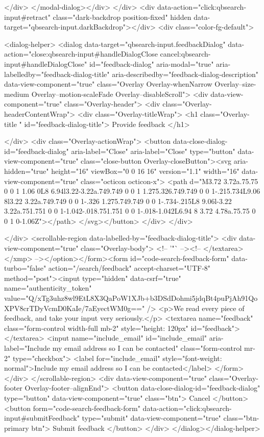     </div>
</modal-dialog></div>
  </div>
  <div data-action="click:qbsearch-input#retract" class="dark-backdrop position-fixed" hidden data-target="qbsearch-input.darkBackdrop"></div>
  <div class="color-fg-default">
    
<dialog-helper>
  <dialog data-target="qbsearch-input.feedbackDialog" data-action="close:qbsearch-input#handleDialogClose cancel:qbsearch-input#handleDialogClose" id="feedback-dialog" aria-modal="true" aria-labelledby="feedback-dialog-title" aria-describedby="feedback-dialog-description" data-view-component="true" class="Overlay Overlay-whenNarrow Overlay--size-medium Overlay--motion-scaleFade Overlay--disableScroll">
    <div data-view-component="true" class="Overlay-header">
  <div class="Overlay-headerContentWrap">
    <div class="Overlay-titleWrap">
      <h1 class="Overlay-title " id="feedback-dialog-title">
        Provide feedback
      </h1>
        
    </div>
    <div class="Overlay-actionWrap">
      <button data-close-dialog-id="feedback-dialog" aria-label="Close" aria-label="Close" type="button" data-view-component="true" class="close-button Overlay-closeButton"><svg aria-hidden="true" height="16" viewBox="0 0 16 16" version="1.1" width="16" data-view-component="true" class="octicon octicon-x">
    <path d="M3.72 3.72a.75.75 0 0 1 1.06 0L8 6.94l3.22-3.22a.749.749 0 0 1 1.275.326.749.749 0 0 1-.215.734L9.06 8l3.22 3.22a.749.749 0 0 1-.326 1.275.749.749 0 0 1-.734-.215L8 9.06l-3.22 3.22a.751.751 0 0 1-1.042-.018.751.751 0 0 1-.018-1.042L6.94 8 3.72 4.78a.75.75 0 0 1 0-1.06Z"></path>
</svg></button>
    </div>
  </div>
  
</div>
      <scrollable-region data-labelled-by="feedback-dialog-title">
        <div data-view-component="true" class="Overlay-body">        <!-- '"` --><!-- </textarea></xmp> --></option></form><form id="code-search-feedback-form" data-turbo="false" action="/search/feedback" accept-charset="UTF-8" method="post"><input type="hidden" data-csrf="true" name="authenticity_token" value="Q/xTg3uhz8wl9EtL8X3QaPoW1XJb+b3DSdDohmi5jdqBt4puPjAh91QoXPV8crTDyVcmD0KaIe/7aEyectWM0g==" />
          <p>We read every piece of feedback, and take your input very seriously.</p>
          <textarea name="feedback" class="form-control width-full mb-2" style="height: 120px" id="feedback"></textarea>
          <input name="include_email" id="include_email" aria-label="Include my email address so I can be contacted" class="form-control mr-2" type="checkbox">
          <label for="include_email" style="font-weight: normal">Include my email address so I can be contacted</label>
</form></div>
      </scrollable-region>
      <div data-view-component="true" class="Overlay-footer Overlay-footer--alignEnd">          <button data-close-dialog-id="feedback-dialog" type="button" data-view-component="true" class="btn">    Cancel
</button>
          <button form="code-search-feedback-form" data-action="click:qbsearch-input#submitFeedback" type="submit" data-view-component="true" class="btn-primary btn">    Submit feedback
</button>
</div>
</dialog></dialog-helper>

